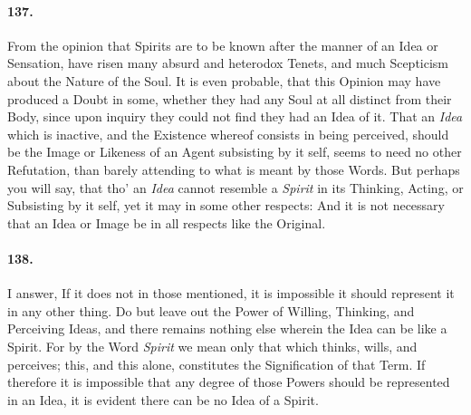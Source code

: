 \documentclass[]{article}
\newenvironment{sectionbody}{}{}
\begin{document}
\begin{sectionbody}
\paragraph{137.} From the opinion that Spirits are to be known after the manner of
an Idea or Sensation, have risen many absurd and heterodox
Tenets, and much Scepticism about the Nature of the Soul.  It is
even probable, that this Opinion may have produced a Doubt in
some, whether they had any Soul at all distinct from their Body,
since upon inquiry they could not find they had an Idea of it.
That an \emph{Idea} which is inactive, and the Existence whereof
consists in being perceived, should be the Image or Likeness of
an Agent subsisting by it self, seems to need no other
Refutation, than barely attending to what is meant by those
Words.  But perhaps you will say, that tho' an \emph{Idea}
cannot resemble a \emph{Spirit} in its Thinking, Acting, or
Subsisting by it self, yet it may in some other respects: And it
is not necessary that an Idea or Image be in all respects like
the Original.



\paragraph{138.} I answer, If it does not in those mentioned, it is impossible it
should represent it in any other thing.  Do but leave out the
Power of Willing, Thinking, and Perceiving Ideas, and there
remains nothing else wherein the Idea can be like a Spirit.  For
by the Word \emph{Spirit} we mean only that which thinks, wills,
and perceives; this, and this alone, constitutes the
Signification of that Term.  If therefore it is impossible that
any degree of those Powers should be represented in an Idea, it
is evident there can be no Idea of a Spirit.




\end{sectionbody}
\end{document}
